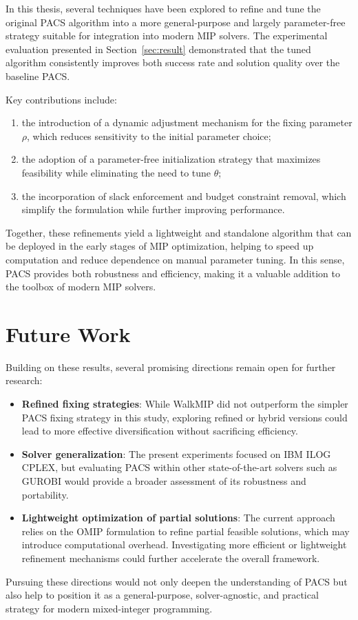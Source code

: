 In this thesis, several techniques have been explored to refine and tune the original PACS algorithm into a more general-purpose and largely parameter-free strategy suitable for integration into modern MIP solvers. The experimental evaluation presented in Section~\ref{sec:result} demonstrated that the tuned algorithm consistently improves both success rate and solution quality over the baseline PACS.

Key contributions include:
\begin{enumerate}
    \item the introduction of a dynamic adjustment mechanism for the fixing parameter $\rho$, which reduces sensitivity to the initial parameter choice;
    \item the adoption of a parameter-free initialization strategy that maximizes feasibility while eliminating the need to tune $\theta$;
    \item the incorporation of slack enforcement and budget constraint removal, which simplify the formulation while further improving performance.
\end{enumerate}
Together, these refinements yield a lightweight and standalone algorithm that can be deployed in the early stages of MIP optimization, helping to speed up computation and reduce dependence on manual parameter tuning. In this sense, PACS provides both robustness and efficiency, making it a valuable addition to the toolbox of modern MIP solvers.

\section{Future Work}
Building on these results, several promising directions remain open for further research:
\begin{itemize}
    \item \textbf{Refined fixing strategies}: While WalkMIP did not outperform the simpler PACS fixing strategy in this study, exploring refined or hybrid versions could lead to more effective diversification without sacrificing efficiency.
    \item \textbf{Solver generalization}: The present experiments focused on IBM ILOG CPLEX, but evaluating PACS within other state-of-the-art solvers such as GUROBI would provide a broader assessment of its robustness and portability.
    \item \textbf{Lightweight optimization of partial solutions}: The current approach relies on the OMIP formulation to refine partial feasible solutions, which may introduce computational overhead. Investigating more efficient or lightweight refinement mechanisms could further accelerate the overall framework.
\end{itemize}

Pursuing these directions would not only deepen the understanding of PACS but also help to position it as a general-purpose, solver-agnostic, and practical strategy for modern mixed-integer programming.